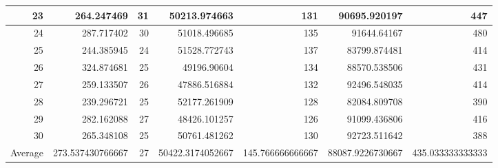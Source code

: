 \begin{table}
\begin{adjustwidth}{}{}
{{\begin{tabular}{|r|r|r|r|r|r|r|}
	\hline
	23                                         & 264.247469                   & 31                                    & 50213.974663                   & 131                                   & 90695.920197                         & 447                                    \\ 
	\hline
	24                                         & 287.717402                   & 30                                    & 51018.496685                   & 135                                   & 91644.64167                          & 480                                    \\ 
	\hline
	25                                         & 244.385945                   & 24                                    & 51528.772743                   & 137                                   & 83799.874481                         & 414                                    \\ 
	\hline
	26                                         & 324.874681                   & 25                                    & 49196.90604                    & 134                                   & 88570.538506                         & 431                                    \\ 
	\hline
	27                                         & 259.133507                   & 26                                    & 47886.516884                   & 132                                   & 92496.548035                         & 414                                    \\ 
	\hline
	28                                         & 239.296721                   & 25                                    & 52177.261909                   & 128                                   & 82084.809708                         & 390                                    \\ 
	\hline
	29                                         & 282.162088                   & 27                                    & 48426.101257                   & 126                                   & 91099.436806                         & 416                                    \\ 
	\hline
	30                                         & 265.348108                   & 25                                    & 50761.481262                   & 130                                   & 92723.511642                         & 388                                    \\ 
	\hline
	\multicolumn{1}{|l|}{Average}              & 273.537430766667             & 27                                    & 50422.3174052667               & 145.766666666667                      & 88087.9226730667                     & 435.033333333333                       \\ 

\end{tabular}}}
\end{adjustwidth}
\end{table}

